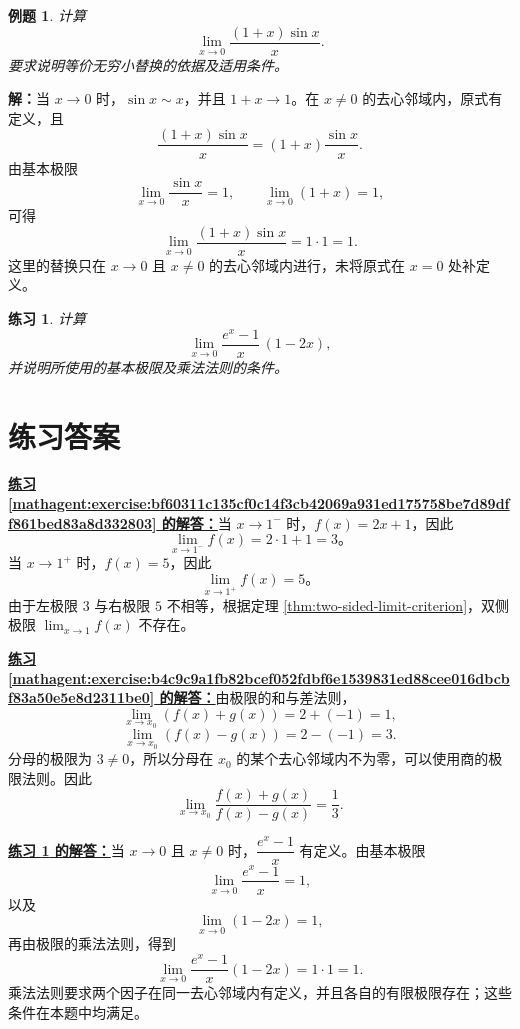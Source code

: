 \documentclass[UTF8,fontset=fandol,11pt]{ctexart}
\newtheorem{example}[definition]{例题}
\newtheorem{exercise}[definition]{练习}
\begin{document}
\begin{example}
计算
\[
\lim_{x\to0}\frac{(1+x)\sin x}{x}.
\]
要求说明等价无穷小替换的依据及适用条件。
\end{example}
\par\noindent\textbf{解：}当 $x\to0$ 时，$\sin x\sim x$，并且 $1+x\to1$。在 $x\neq0$ 的去心邻域内，原式有定义，且
\[
\frac{(1+x)\sin x}{x}=(1+x)\frac{\sin x}{x}.
\]
由基本极限
\[
\lim_{x\to0}\frac{\sin x}{x}=1,
\qquad
\lim_{x\to0}(1+x)=1,
\]
可得
\[
\lim_{x\to0}\frac{(1+x)\sin x}{x}=1\cdot1=1.
\]
这里的替换只在 $x\to0$ 且 $x\neq0$ 的去心邻域内进行，未将原式在 $x=0$ 处补定义。\par
\begin{exercise}
\label{mathagent:exercise:410f498083ff9a28d1a2acf9839e74554b434d3445561642fdfe5d3854f06971}
计算
\[
\lim_{x\to0}\frac{e^x-1}{x}\,(1-2x),
\]
并说明所使用的基本极限及乘法法则的条件。
\end{exercise}
\section*{练习答案}
\par\noindent\textbf{\hyperref[mathagent:exercise:bf60311c135cf0c14f3cb42069a931ed175758be7d89dff861bed83a8d332803]{练习 \ref*{mathagent:exercise:bf60311c135cf0c14f3cb42069a931ed175758be7d89dff861bed83a8d332803} 的解答：}}当 $x\to1^-$ 时，$f(x)=2x+1$，因此
\[
\lim_{x\to1^-}f(x)=2\cdot1+1=3\text{。}
\]
当 $x\to1^+$ 时，$f(x)=5$，因此
\[
\lim_{x\to1^+}f(x)=5\text{。}
\]
由于左极限 $3$ 与右极限 $5$ 不相等，根据定理 \ref{thm:two-sided-limit-criterion}，双侧极限 $\lim_{x\to1}f(x)$ 不存在。\par
\par\noindent\textbf{\hyperref[mathagent:exercise:b4c9c9a1fb82bcef052fdbf6e1539831ed88cee016dbcbf83a50e5e8d2311be0]{练习 \ref*{mathagent:exercise:b4c9c9a1fb82bcef052fdbf6e1539831ed88cee016dbcbf83a50e5e8d2311be0} 的解答：}}由极限的和与差法则，
\[
\lim_{x\to x_0}(f(x)+g(x))=2+(-1)=1,
\]
\[
\lim_{x\to x_0}(f(x)-g(x))=2-(-1)=3.
\]
分母的极限为 $3\neq0$，所以分母在 $x_0$ 的某个去心邻域内不为零，可以使用商的极限法则。因此
\[
\lim_{x\to x_0}\frac{f(x)+g(x)}{f(x)-g(x)}=\frac{1}{3}.
\]\par
\par\noindent\textbf{\hyperref[mathagent:exercise:410f498083ff9a28d1a2acf9839e74554b434d3445561642fdfe5d3854f06971]{练习 \ref*{mathagent:exercise:410f498083ff9a28d1a2acf9839e74554b434d3445561642fdfe5d3854f06971} 的解答：}}当 $x\to0$ 且 $x\neq0$ 时，$\dfrac{e^x-1}{x}$ 有定义。由基本极限
\[
\lim_{x\to0}\frac{e^x-1}{x}=1,
\]
以及
\[
\lim_{x\to0}(1-2x)=1,
\]
再由极限的乘法法则，得到
\[
\lim_{x\to0}\frac{e^x-1}{x}(1-2x)=1\cdot1=1.
\]
乘法法则要求两个因子在同一去心邻域内有定义，并且各自的有限极限存在；这些条件在本题中均满足。\par
\end{document}
